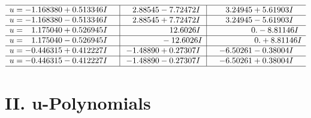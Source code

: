 \documentclass[1p]{elsarticle_modified}
\theoremstyle{definition}
\begin{document}
$$\begin{array}{c|c|c}
 \hline 
\begin{aligned}
u &= -1.168380 + 0.513346 I\end{aligned}
 & \phantom{-}2.88545 - 7.72472 I & \phantom{-}3.24945 + 5.61903 I \\ \hline\begin{aligned}
u &= -1.168380 - 0.513346 I\end{aligned}
 & \phantom{-}2.88545 + 7.72472 I & \phantom{-}3.24945 - 5.61903 I \\ \hline\begin{aligned}
u &= \phantom{-}1.175040 + 0.526945 I\end{aligned}
 & \phantom{-0.000000 -}12.6026 I & \phantom{-0.000000 } 0. - 8.81146 I \\ \hline\begin{aligned}
u &= \phantom{-}1.175040 - 0.526945 I\end{aligned}
 & \phantom{-0.000000 } -12.6026 I & \phantom{-0.000000 -}0. + 8.81146 I \\ \hline\begin{aligned}
u &= -0.446315 + 0.412227 I\end{aligned}
 & -1.48890 + 0.27307 I & -6.50261 - 0.38004 I \\ \hline\begin{aligned}
u &= -0.446315 - 0.412227 I\end{aligned}
 & -1.48890 - 0.27307 I & -6.50261 + 0.38004 I\\
 \hline 
 \end{array}$$\newpage
\newpage\renewcommand{\arraystretch}{1}
\centering \section*{ II. u-Polynomials}
\end{document}
